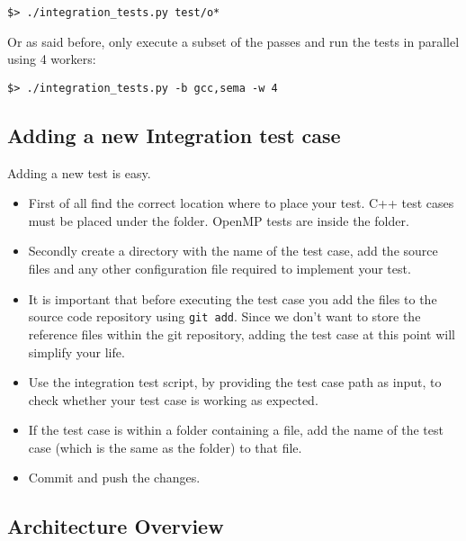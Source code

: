 \begin{verbatim}
$> ./integration_tests.py test/o*
\end{verbatim}

Or as said before, only execute a subset of the passes and run the tests in
parallel using 4 workers:

\begin{verbatim}
$> ./integration_tests.py -b gcc,sema -w 4
\end{verbatim}

\subsection{Adding a new Integration test case} 

Adding a new test is easy. 
\begin{itemize}
	\item First of all find the correct location where to place
		your test. C++ test cases must be placed under the  folder.
		OpenMP tests are inside the  folder. 

	\item Secondly create a directory with the name of the test case, add the
		source files and any other configuration file required to implement your
		test. 

	\item It is important that before executing the test case you add the files
		to the source code repository using {\tt git add}. Since we don't want to
		store the reference files within the git repository, adding the test case
		at this point will simplify your life. 
	
	\item Use the integration test script, by providing the test case path as
		input, to check whether your test case is working as expected.

	\item If the test case is within a folder containing a  file,
		add the name of the test case (which is the same as the folder) to that
		file.

	\item Commit and push the changes. 

\end{itemize}


\subsection{Architecture Overview}

